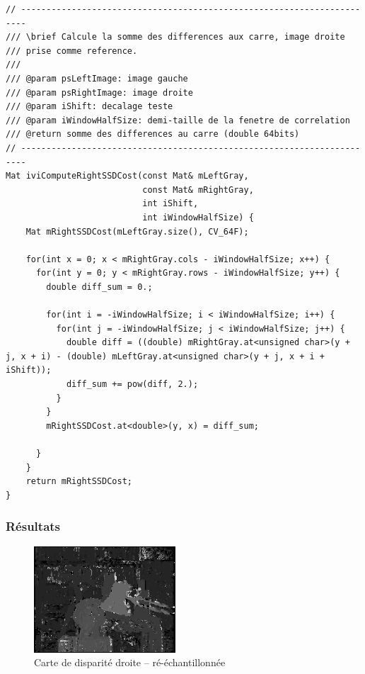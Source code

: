 \documentclass[a4paper]{article}
\begin{document}
\begin{lstlisting}
// -----------------------------------------------------------------------
/// \brief Calcule la somme des differences aux carre, image droite
/// prise comme reference.
///
/// @param psLeftImage: image gauche
/// @param psRightImage: image droite
/// @param iShift: decalage teste
/// @param iWindowHalfSize: demi-taille de la fenetre de correlation
/// @return somme des differences au carre (double 64bits)
// -----------------------------------------------------------------------
Mat iviComputeRightSSDCost(const Mat& mLeftGray,
                           const Mat& mRightGray,
                           int iShift,
                           int iWindowHalfSize) {
    Mat mRightSSDCost(mLeftGray.size(), CV_64F);

    for(int x = 0; x < mRightGray.cols - iWindowHalfSize; x++) {
      for(int y = 0; y < mRightGray.rows - iWindowHalfSize; y++) {
        double diff_sum = 0.;

        for(int i = -iWindowHalfSize; i < iWindowHalfSize; i++) {
          for(int j = -iWindowHalfSize; j < iWindowHalfSize; j++) {
            double diff = ((double) mRightGray.at<unsigned char>(y + j, x + i) - (double) mLeftGray.at<unsigned char>(y + j, x + i + iShift));
            diff_sum += pow(diff, 2.);
          }
        }
        mRightSSDCost.at<double>(y, x) = diff_sum;

      }
    }
    return mRightSSDCost;
}
\end{lstlisting}

\subsubsection{Résultats}

\begin{figure}[h]
\begin{center}
	\includegraphics[width=200px]{right-disparity_resampled.png}
\end{center}
\caption{Carte de disparité droite -- ré-échantillonnée}
\end{figure}
\end{document}
